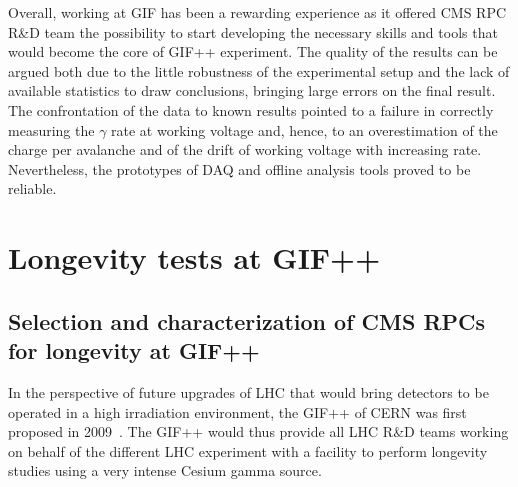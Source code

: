 	Overall, working at GIF has been a rewarding experience as it offered CMS RPC R\&D team the possibility to start developing the necessary skills and tools that would become the core of GIF++ experiment. The quality of the results can be argued both due to the little robustness of the experimental setup and the lack of available statistics to draw conclusions, bringing large errors on the final result. The confrontation of the data to known results pointed to a failure in correctly measuring the $\gamma$ rate at working voltage and, hence, to an overestimation of the charge per avalanche and of the drift of working voltage with increasing rate. Nevertheless, the prototypes of DAQ and offline analysis tools proved to be reliable.

\section{Longevity tests at \acs{GIF++}}
\label{chapt5:sec:GIFpptests}

	\subsection{Selection and characterization of CMS RPCs for longevity at GIF++}
	\label{chapt5:ssec:selection}

	In the perspective of future upgrades of LHC that would bring detectors to be operated in a high irradiation environment, the \acl{GIF++} of CERN was first proposed in 2009~\cite{GIF++2009}. The GIF++ would thus provide all LHC R\&D teams working on behalf of the different LHC experiment with a facility to perform longevity studies using a very intense Cesium gamma source.
	
